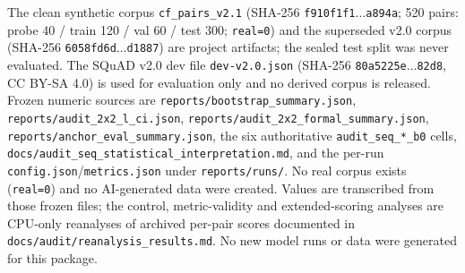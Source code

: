 \documentclass[11pt,twocolumn]{article}
\begin{document}
The clean synthetic corpus \texttt{cf\_pairs\_v2.1} (SHA-256
\texttt{f910f1f1$\ldots$a894a}; 520 pairs: probe 40 / train 120 / val 60 /
test 300; \texttt{real=0}) and the superseded v2.0 corpus (SHA-256
\texttt{6058fd6d$\ldots$d1887}) are project artifacts; the sealed test split was
never evaluated. The SQuAD v2.0 dev file \texttt{dev-v2.0.json} (SHA-256
\texttt{80a5225e$\ldots$82d8}, CC BY-SA 4.0) is used for evaluation only and no
derived corpus is released. Frozen numeric sources are
\texttt{reports/bootstrap\_summary.json},
\texttt{reports/audit\_2x2\_l\_ci.json},
\texttt{reports/audit\_2x2\_formal\_summary.json},
\texttt{reports/anchor\_eval\_summary.json}, the six authoritative
\texttt{audit\_seq\_*\_b0} cells, \texttt{docs/audit\_seq\_statistical\_interpretation.md},
and the per-run \texttt{config.json}/\texttt{metrics.json} under
\texttt{reports/runs/}. No real corpus exists (\texttt{real=0}) and no AI-generated data were created.
Values are transcribed from those frozen files; the control, metric-validity
and extended-scoring analyses are CPU-only reanalyses of archived per-pair
scores documented in \texttt{docs/audit/reanalysis\_results.md}. No new model
runs or data were generated for this package.


\end{document}
